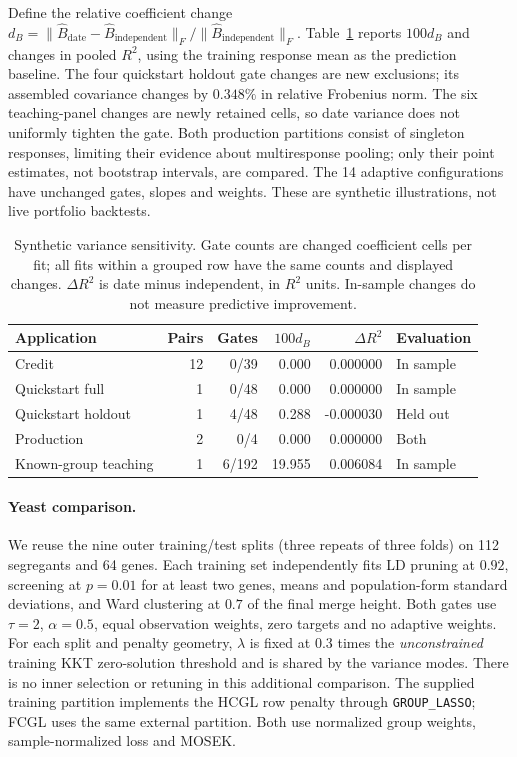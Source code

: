 \documentclass[11pt,a4paper]{article}
\begin{document}
Define the relative coefficient change
$d_B=\|\widehat B_{\mathrm{date}}-\widehat B_{\mathrm{independent}}\|_F/
\|\widehat B_{\mathrm{independent}}\|_F$.
Table~\ref{tab:variance-synthetic} reports $100d_B$ and changes in pooled
$R^2$, using the training response mean as the prediction baseline.
The four quickstart holdout gate changes are new exclusions; its assembled
covariance changes by $0.348\%$ in relative Frobenius norm.
The six teaching-panel changes are newly retained cells, so date variance
does not uniformly tighten the gate. Both production partitions consist
of singleton responses, limiting their evidence about multiresponse pooling;
only their point estimates, not bootstrap intervals, are compared.
The 14 adaptive configurations have unchanged gates, slopes and weights.
These are synthetic illustrations, not live portfolio backtests.

\begin{table}[htbp]\centering\small
\caption{Synthetic variance sensitivity. Gate counts are changed coefficient
cells per fit; all fits within a grouped row have the same counts and displayed
changes. $\Delta R^2$ is date minus independent, in $R^2$ units. In-sample
changes do not measure predictive improvement.}\label{tab:variance-synthetic}
\begin{tabular}{lrrrrl}\toprule
Application & Pairs & Gates & $100d_B$ & $\Delta R^2$ & Evaluation\\\midrule
Credit & 12 & 0/39 & 0.000 & 0.000000 & In sample \\
Quickstart full & 1 & 0/48 & 0.000 & 0.000000 & In sample \\
Quickstart holdout & 1 & 4/48 & 0.288 & -0.000030 & Held out \\
Production & 2 & 0/4 & 0.000 & 0.000000 & Both \\
Known-group teaching & 1 & 6/192 & 19.955 & 0.006084 & In sample \\
\bottomrule\end{tabular}\end{table}

\paragraph{Yeast comparison.}
We reuse the nine outer training/test splits (three repeats of three folds)
on 112 segregants and 64 genes. Each training set independently fits LD
pruning at $0.92$, screening at $p=0.01$ for at least two genes, means and
population-form standard deviations, and Ward clustering at $0.7$ of the
final merge height. Both gates use $\tau=2$, $\alpha=0.5$, equal observation
weights, zero targets and no adaptive weights. For each split and penalty
geometry, $\lambda$ is fixed at $0.3$ times the \emph{unconstrained}
training KKT zero-solution threshold and is shared by the variance modes.
There is no inner selection or retuning in this additional comparison.
The supplied training partition implements the HCGL row penalty through
\texttt{GROUP\_LASSO}; FCGL uses the same external partition. Both use
normalized group weights, sample-normalized loss and MOSEK.
\end{document}
